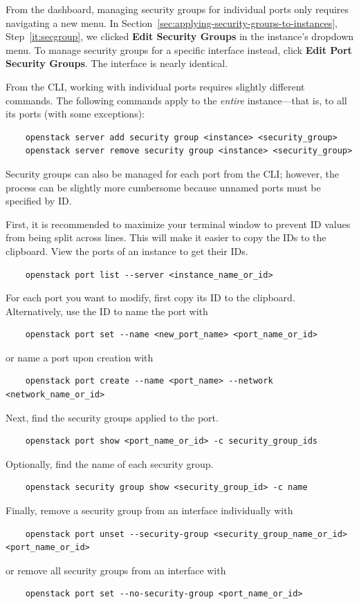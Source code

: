 \documentclass[letterpaper, 12pt]{article}
\begin{document}
From the dashboard, managing security groups for individual ports only requires navigating a new menu.
In Section~\ref{sec:applying-security-groups-to-instances}, Step~\ref{it:secgroup}, we clicked \textbf{Edit Security Groups} in the instance's dropdown menu.
To manage security groups for a specific interface instead, click \textbf{Edit Port Security Groups}.
The interface is nearly identical.

From the CLI, working with individual ports requires slightly different commands.
The following commands apply to the \textit{entire} instance---that is, to all its ports (with some exceptions):
\begin{lstlisting}
    openstack server add security group <instance> <security_group>
    openstack server remove security group <instance> <security_group>
\end{lstlisting}

Security groups can also be managed for each port from the CLI; however, the process can be slightly more cumbersome because unnamed ports must be specified by ID.

First, it is recommended to maximize your terminal window to prevent ID values from being split across lines.
This will make it easier to copy the IDs to the clipboard.
View the ports of an instance to get their IDs.
\begin{lstlisting}
    openstack port list --server <instance_name_or_id>
\end{lstlisting}
\noindent
For each port you want to modify, first copy its ID to the clipboard.
Alternatively, use the ID to name the port with
\begin{lstlisting}
    openstack port set --name <new_port_name> <port_name_or_id>
\end{lstlisting}
\noindent
or name a port upon creation with
\begin{lstlisting}
    openstack port create --name <port_name> --network <network_name_or_id>
\end{lstlisting}
\noindent
Next, find the security groups applied to the port.
\begin{lstlisting}
    openstack port show <port_name_or_id> -c security_group_ids
\end{lstlisting}
\noindent
Optionally, find the name of each security group.
\begin{lstlisting}
    openstack security group show <security_group_id> -c name
\end{lstlisting}
\noindent
Finally, remove a security group from an interface individually with
\begin{lstlisting}
    openstack port unset --security-group <security_group_name_or_id> <port_name_or_id>
\end{lstlisting}
\noindent
or remove all security groups from an interface with
\begin{lstlisting}
    openstack port set --no-security-group <port_name_or_id>
\end{lstlisting}
\end{document}

